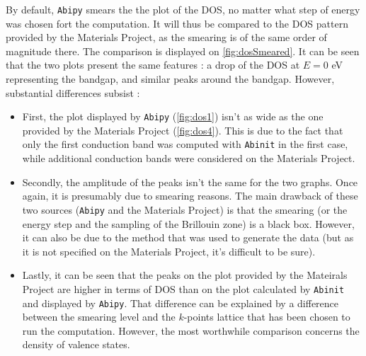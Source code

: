 \documentclass[11pt,a4paper]{article}
\begin{document}
By default, \texttt{Abipy} smears the the plot of the DOS, no matter what step of energy was chosen fort the computation. It will thus be compared to the DOS pattern provided by the Materials Project, as the smearing is of the same order of magnitude there. The comparison is displayed on \autoref{fig:dosSmeared}. It can be seen that the two plots present the same features : a drop of the DOS at $E = 0$ eV representing the bandgap, and similar peaks around the bandgap. However, substantial differences subsist : 
\begin{itemize}
\item First, the plot displayed by \texttt{Abipy} (\autoref{fig:dos1}) isn't as wide as the one provided by the Materials Project (\autoref{fig:dos4}). This is due to the fact that only the first conduction band was computed with \texttt{Abinit} in the first case, while additional conduction bands were considered on the Materials Project.
\item Secondly, the amplitude of the peaks isn't the same for the two graphs. Once again, it is presumably due to smearing reasons. The main drawback of these two sources (\texttt{Abipy} and the Materials Project) is that the smearing (or the energy step and the sampling of the Brillouin zone) is a black box. However, it can also be due to the method that was used to generate the data (but as it is not specified on the Materials Project, it's difficult to be sure).
\item Lastly, it can be seen that the peaks on the plot provided by the Mateirals Project are higher in terms of DOS than on the plot calculated by \texttt{Abinit} and displayed by \texttt{Abipy}. That difference can be explained by a difference between the smearing level and the $k$-points lattice that has been chosen to run the computation. However, the most worthwhile comparison concerns the density of valence states.
\end{itemize}
\end{document}
